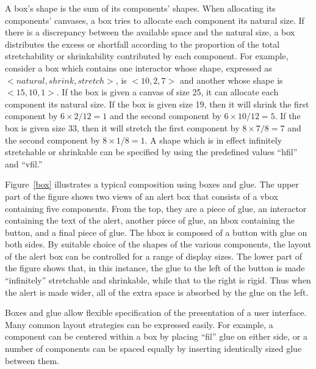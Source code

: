 A box's shape is the sum of its components' shapes.  When allocating its
components' canvases,
a box tries to allocate each component its natural size.
If there is a discrepancy between the available space and the natural size,
a box distributes the excess or shortfall according to the
proportion of the total stretchability or shrinkability contributed by each
component.
For example, consider a box which
contains one interactor whose shape,
expressed as $<\!\!natural,shrink,stretch\!\!>$, is $<\!\!10,2,7\!\!>$
and another whose shape is $<\!\!15,10,1\!\!>$.
If the box is given a canvas
of size 25, it can allocate each component its natural size.
If the box is given size 19, then it will shrink the first component
by $6 \times 2/12 = 1$ and the second component by $6 \times 10/12 = 5$.
If the box is given size 33, then it will stretch the first component
by $8 \times 7/8 = 7$ and the second component by $8 \times 1/8 = 1$.
A shape which is in effect infinitely stretchable or shrinkable can be
specified by using the predefined values ``hfil'' and ``vfil.''

\begin{figure*}
\vspace{1.5in}
\vspace{1.25in}
\caption{An example of composition with boxes and glue}
\label{box}
\end{figure*}

Figure~\ref{box} illustrates a typical composition using boxes and glue.
The upper part of the figure shows two views of an alert box
that consists of a vbox containing five components.
From the top, they are a piece of glue, an interactor containing the text of
the alert, another piece of glue, an hbox containing the button, and a final
piece of glue.  The hbox is composed of a button with glue on both sides.
By suitable choice of the shapes of the various
components, the layout of the alert box can be controlled for a
range of display
sizes.  The lower part of the figure shows that, in this instance,
the glue to the left of the button is made
``infinitely'' stretchable and shrinkable, while that to the right is rigid.
Thus when the alert is made wider, all of the extra space is absorbed by the
glue on the left.

Boxes and glue allow flexible specification of the presentation of a user
interface.
Many common layout strategies can be expressed easily.  For
example, a component can be centered within a box by placing ``fil''
glue on either side, or a number of components can be spaced
equally by inserting identically sized glue between them.

